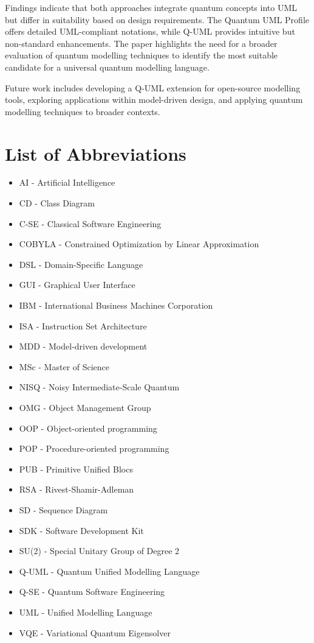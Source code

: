 \documentclass{article}
\begin{document}
Findings indicate that both approaches integrate quantum concepts into UML but differ in suitability based on design requirements. The Quantum UML Profile offers detailed UML-compliant notations, while Q-UML provides intuitive but non-standard enhancements. The paper highlights the need for a broader evaluation of quantum modelling techniques to identify the most suitable candidate for a universal quantum modelling language.

Future work includes developing a Q-UML extension for open-source modelling tools, exploring applications within model-driven design, and applying quantum modelling techniques to broader contexts. 

\newpage

\listoffigures
\newpage

\section*{List of Abbreviations}
\begin{itemize}
    \item AI - Artificial Intelligence
    \item CD - Class Diagram
    \item C-SE - Classical Software Engineering
    \item COBYLA - Constrained Optimization by Linear Approximation
    \item DSL - Domain-Specific Language
    \item GUI - Graphical User Interface
    \item IBM - International Business Machines Corporation
    \item ISA - Instruction Set Architecture
    \item MDD - Model-driven development
    \item MSc - Master of Science
    \item NISQ - Noisy Intermediate-Scale Quantum
    \item OMG - Object Management Group
    \item OOP - Object-oriented programming
    \item POP - Procedure-oriented programming
    \item PUB - Primitive Unified Blocs
    \item RSA - Rivest-Shamir-Adleman
    \item SD - Sequence Diagram
    \item SDK - Software Development Kit
    \item SU(2) - Special Unitary Group of Degree 2
    \item Q-UML - Quantum Unified Modelling Language
    \item Q-SE - Quantum Software Engineering
    \item UML - Unified Modelling Language
    \item VQE - Variational Quantum Eigensolver
\end{itemize}
\newpage
\end{document}
